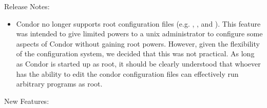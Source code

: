 \noindent Release Notes:

\begin{itemize}

\item Condor no longer supports root configuration files
(e.g. ,
, and
).  This feature was intended to
give limited powers to a unix administrator to configure some aspects
of Condor without gaining root powers.  However, given the flexibility
of the configuration system, we decided that this was not practical.
As long as Condor is started up as root, it should be clearly
understood that whoever has the ability to edit the condor
configuration files can effectively run arbitrary programs as root.

\end{itemize}


\noindent New Features:

